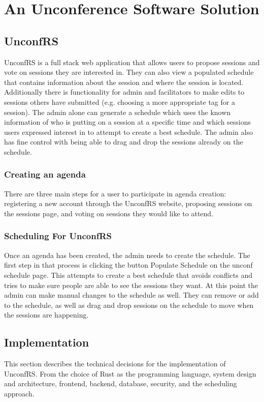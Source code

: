 \chapter{An Unconference Software Solution}
\section{UnconfRS}
UnconfRS is a full stack web application that allows users to propose sessions and vote on sessions they are interested in. They can also view a populated schedule that contains information about the session and where the session is located. Additionally there is functionality for admin and facilitators to make edits to sessions others have submitted (e.g. choosing a more appropriate tag for a session). The admin alone can generate a schedule which uses the known information of who is putting on a session at a specific time and which sessions users expressed interest in to attempt to create a best schedule. The admin also has fine control with being able to drag and drop the sessions already on the schedule. 
\subsection{Creating an agenda}
There are three main steps for a user to participate in agenda creation: registering a new account through the UnconfRS website, proposing sessions on the sessions page, and voting on sessions they would like to attend.\\

\subsection{Scheduling For UnconfRS}
Once an agenda has been created, the admin needs to create the schedule. The first step in that process is clicking the button Populate Schedule on the unconf schedule page. This attempts to create a best schedule that avoids conflicts and tries to make sure people are able to see the sessions they want. At this point the admin can make manual changes to the schedule as well. They can remove or add to the schedule, as well as drag and drop sessions on the schedule to move when the sessions are happening.\\

\section{Implementation}
This section describes the technical decisions for the implementation of UnconfRS. From the choice of Rust as the programming language, system design and architecture, frontend, backend, database, security, and the scheduling approach.

